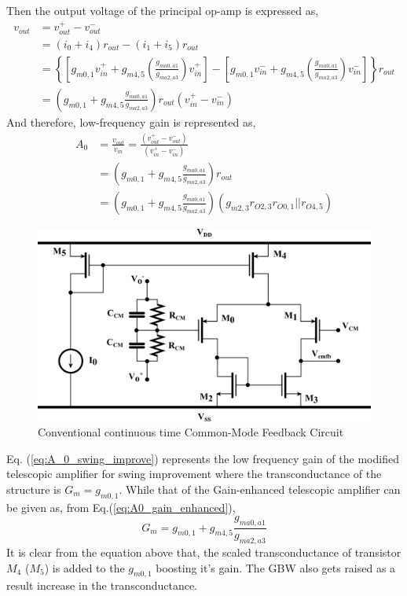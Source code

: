 Then the output voltage of the principal op-amp is expressed as,
%
\begin{equation}
    \begin{split}
        v_{out} &= v_{out}^+ - v_{out}^-\\
                &= (i_0+i_4)r_{out} - (i_1+i_5)r_{out}\\
                &= \left\{\left[g_{m0,1}v_{in}^++g_{m4,5}\left(\frac{g_{ma0,a1}}{g_{ma2,a3}}\right) v_{in}^+\right]-\left[g_{m0,1}v_{in}^-+g_{m4,5}\left(\frac{g_{ma0,a1}}{g_{ma2,a3}}\right) v_{in}^-\right]\right\}r_{out}\\
                &=\left(g_{m0,1}+g_{m4,5}\frac{g_{ma0,a1}}{g_{ma2,a3}}\right)r_{out}\left(v_{in}^+ - v_{in}^-\right)
    \end{split}
\end{equation}
%
And therefore, low-frequency gain is represented as,
%
\begin{equation}\label{eq:A0_gain_enhanced}
\begin{split}
    A_0 &= \frac{v_{out}}{v_{in}}=\frac{\left(v_{out}^+ - v_{out}^-\right)}{\left(v_{in}^+ - v_{in}^-\right)}\\ 
        &= \left(g_{m0,1}+g_{m4,5}\frac{g_{ma0,a1}}{g_{ma2,a3}}\right)r_{out}\\
        &=\left(g_{m0,1}+g_{m4,5}\frac{g_{ma0,a1}}{g_{ma2,a3}}\right)\left(g_{m2,3}r_{O2,3}r_{O0,1}||r_{O4,5}\right)
\end{split}
\end{equation}
%
%
\begin{figure}[t]
\centering
\includegraphics[width=0.8\columnwidth]{Chap05/Figures/common_mode_feedback.png}
\caption{Conventional continuous time Common-Mode Feedback Circuit}
\label{fig:COMMON_MODE}
\end{figure}
%
Eq. (\ref{eq:A_0_swing_improve}) represents the low frequency gain of the modified telescopic amplifier for swing improvement where the transconductance of the structure is $G_m = g_{m0,1}$. While that of the Gain-enhanced telescopic amplifier can be given as, from Eq.(\ref{eq:A0_gain_enhanced}),
%
\begin{equation}
    G_m = g_{m0,1}+g_{m4,5}\frac{g_{ma0,a1}}{g_{ma2,a3}}
\end{equation}
%
It is clear from the equation above that, the scaled transconductance of transistor $M_4$ ($M_5$) is added to the $g_{m0,1}$ boosting it's gain. The GBW also gets raised as a result increase in the transconductance.

